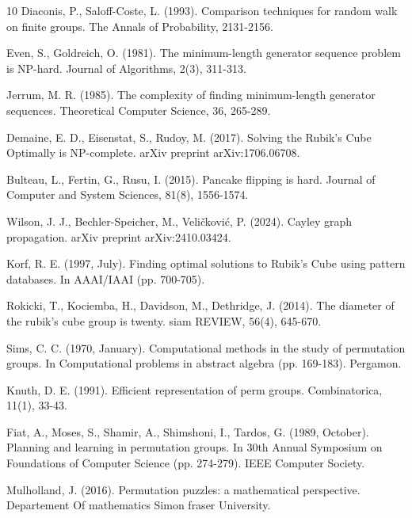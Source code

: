 \documentclass[reqno,11pt]{amsart}
\begin{document}
\begin{thebibliography}{10}
Diaconis, P.,  Saloff-Coste, L. (1993). Comparison techniques for random walk on finite groups. The Annals of Probability, 2131-2156.

Even, S., Goldreich, O. (1981). The minimum-length generator sequence problem is NP-hard. Journal of Algorithms, 2(3), 311-313.

Jerrum, M. R. (1985). The complexity of finding minimum-length generator sequences. Theoretical Computer Science, 36, 265-289.


Demaine, E. D., Eisenstat, S.,  Rudoy, M. (2017). Solving the Rubik's Cube Optimally is NP-complete. arXiv preprint arXiv:1706.06708.

Bulteau, L., Fertin, G.,  Rusu, I. (2015). Pancake flipping is hard. Journal of Computer and System Sciences, 81(8), 1556-1574.

Wilson, J. J., Bechler-Speicher, M., Veličković, P. (2024). Cayley graph propagation. arXiv preprint arXiv:2410.03424.

Korf, R. E. (1997, July). Finding optimal solutions to Rubik's Cube using pattern databases. In AAAI/IAAI (pp. 700-705).

Rokicki, T., Kociemba, H., Davidson, M.,  Dethridge, J. (2014). The diameter of the rubik's cube group is twenty. siam REVIEW, 56(4), 645-670.

Sims, C. C. (1970, January). Computational methods in the study of permutation groups. In Computational problems in abstract algebra (pp. 169-183). Pergamon.

Knuth, D. E. (1991). Efficient representation of perm groups. Combinatorica, 11(1), 33-43.

Fiat, A., Moses, S., Shamir, A., Shimshoni, I.,  Tardos, G. (1989, October). Planning and learning in permutation groups. In 30th Annual Symposium on Foundations of Computer Science (pp. 274-279). IEEE Computer Society.

Mulholland, J. (2016). Permutation puzzles: a mathematical perspective. Departement Of mathematics Simon fraser University.


\end{thebibliography}
\end{document}
